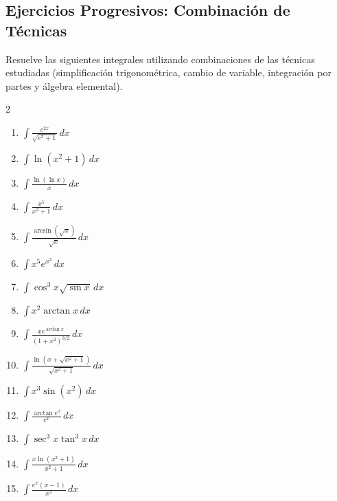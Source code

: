 \documentclass[12pt, letterpaper]{article}
\newcommand{\dx}{\,dx}
\begin{document}
\newpage

\subsection{Ejercicios Progresivos: Combinación de Técnicas}
Resuelve las siguientes integrales utilizando combinaciones de las técnicas estudiadas (simplificación trigonométrica, cambio de variable, integración por partes y álgebra elemental).

\begin{multicols}{2}
\begin{enumerate}[leftmargin=*, resume]
  \item \medio{} $\int \frac{e^{2x}}{\sqrt{e^x + 1}} \dx$
  \item \medio{} $\int \ln(x^2 + 1) \dx$
  \item \medio{} $\int \frac{\ln(\ln x)}{x} \dx$
  \item \medio{} $\int \frac{x^5}{x^3 + 1} \dx$
  \item \medio{} $\int \frac{\arcsin(\sqrt{x})}{\sqrt{x}} \dx$
  \item \medio{} $\int x^5 e^{x^3} \dx$
  \item \medio{} $\int \cos^3 x \sqrt{\sin x} \dx$
  \item \medio{} $\int x^2 \arctan x \dx$
  \item \dificil{} $\int \frac{x e^{\arctan x}}{(1+x^2)^{3/2}} \dx$
  \item \dificil{} $\int \frac{\ln(x + \sqrt{x^2+1})}{\sqrt{x^2+1}} \dx$
  \item \dificil{} $\int x^3 \sin(x^2) \dx$
  \item \dificil{} $\int \frac{\arctan e^x}{e^x} \dx$
  \item \dificil{} $\int \sec^3 x \tan^3 x \dx$
  \item \dificil{} $\int \frac{x \ln(x^2+1)}{x^2+1} \dx$
  \item \dificil{} $\int \frac{e^x(x-1)}{x^2} \dx$
\end{enumerate}
\end{multicols}

\vspace{10pt}

\end{document}
